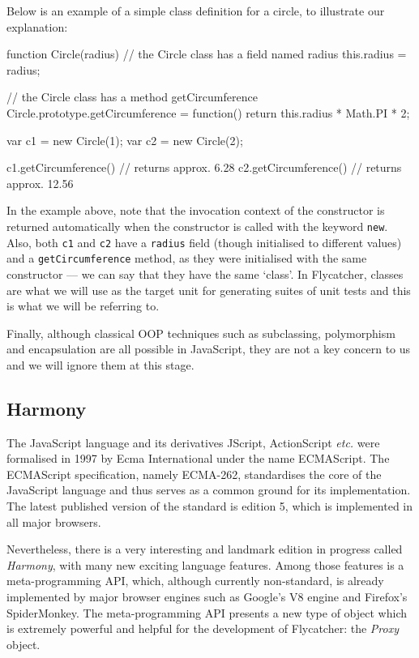 Below is an example of a simple class definition for a circle, to illustrate our explanation:

\begin{code}
function Circle(radius) {
    // the Circle class has a field named radius
    this.radius = radius;
}

// the Circle class has a method getCircumference
Circle.prototype.getCircumference = function() {
    return this.radius * Math.PI * 2;
}

var c1 = new Circle(1);
var c2 = new Circle(2);

c1.getCircumference() // returns approx. 6.28
c2.getCircumference() // returns approx. 12.56

\end{code}

In the example above, note that the invocation context of the constructor is returned automatically when the constructor is called with the keyword \texttt{new}. Also, both \texttt{c1} and \texttt{c2} have a \texttt{radius} field (though initialised to different values) and a \texttt{getCircumference} method, as they were initialised with the same constructor --- we can say that they have the same `class'. In \textsf{Flycatcher}, classes are what we will use as the target unit for generating suites of unit tests and this is what we will be referring to.

Finally, although classical OOP techniques such as subclassing, polymorphism and encapsulation are all possible in JavaScript, they are not a key concern to us and we will ignore them at this stage.

\subsection{Harmony}
The JavaScript language and its derivatives JScript, ActionScript \emph{etc.} were formalised in 1997 by Ecma International under the name ECMAScript. The ECMAScript specification, namely ECMA-262, standardises the core of the JavaScript language and thus serves as a common ground for its implementation. The latest published version of the standard is edition 5, which is implemented in all major browsers.

Nevertheless, there is a very interesting and landmark edition in progress called \emph{Harmony}, with many new exciting language features. Among those features is a meta-programming API, which, although currently non-standard, is already implemented by major browser engines such as Google's V8 engine and Firefox's SpiderMonkey. The meta-programming API presents a new type of object which is extremely powerful and helpful for the development of \textsf{Flycatcher}: the \emph{Proxy} object.

